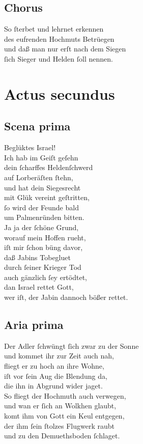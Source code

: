 \documentclass{ees}
\newenvironment{lyrics}[1]{%
  \subsection{#1}\nopagebreak%
  \begin{lyricslist}%
  \let\voice\item%
}{%
  \end{lyricslist}%
}
\begin{document}
\begin{lyrics}{Chorus}
  \voice[Chorus der Israeliter]
  So ſterbet und lehrnet erkennen\\
  des eufrenden Hochmuts Betrüegen\\
  und daß man nur erſt nach dem Siegen\\
  ſich Sieger und Helden ſoll nennen.
\end{lyrics}

\clearpage
\section{Actus secundus}

\begin{lyrics}{Scena prima}
  \voice[Jahel]
  Beglüktes Israel!\\
  Ich hab im Geiſt geſehn\\
  dein ſcharffes Heldenſchwerd\\
  auf Lorberäſten ſtehn,\\
  und hat dein Siegesrecht\\
  mit Glük vereint geſtritten,\\
  ſo wird der Feunde bald\\
  um Palmenründen bitten.\\
  Ja ja der ſchöne Grund,\\
  worauf mein Hoffen rueht,\\
  iſt mir ſchon büng davor,\\
  daß Jabins Tobegluet\\
  durch ſeiner Krieger Tod\\
  auch gänzlich ſey ertödtet,\\
  dan Israel rettet Gott,\\
  wer iſt, der Jabin dannoch bößer rettet.
\end{lyrics}

\begin{lyrics}{Aria prima}
  \voice[Jahel]
  Der Adler ſchwüngt ſich zwar zu der Sonne\\
  und kommet ihr zur Zeit auch nah,\\
  fliegt er zu hoch an ihre Wohne,\\
  iſt vor ſein Aug die Blendung da,\\
  die ihn in Abgrund wider jaget.\\[1ex]
  So fliegt der Hochmuth auch verwegen,\\
  und wan er ſich an Wolkhen glaubt,\\
  komt ihm von Gott ein Keul entgegen,\\
  der ihm ſein ſtolzes Flugwerk raubt\\
  und zu den Demuethsboden ſchlaget.
\end{lyrics}
\end{document}
